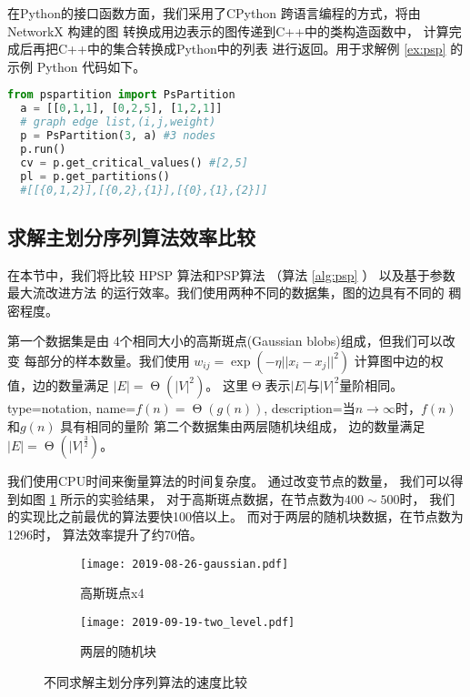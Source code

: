 在Python的接口函数方面，我们采用了CPython
跨语言编程的方式，将由 NetworkX \cite{SciPyProceedings_11} 构建的图
转换成用边表示的图传递到C++中的类构造函数中，
计算完成后再把C++中的集合转换成Python中的列表
进行返回。用于求解例 \ref{ex:psp} 的示例 Python 代码如下。
\begin{lstlisting}[language=Python]
  from pspartition import PsPartition
  a = [[0,1,1], [0,2,5], [1,2,1]] 
  # graph edge list,(i,j,weight)
  p = PsPartition(3, a) #3 nodes
  p.run()
  cv = p.get_critical_values() #[2,5]
  pl = p.get_partitions()
  #[[{0,1,2}],[{0,2},{1}],[{0},{1},{2}]]
\end{lstlisting}

\subsection{求解主划分序列算法效率比较}
在本节中，我们将比较 HPSP 算法和PSP算法
（算法 \ref{alg:psp} ）
以及基于参数最大流改进方法\cite{kolmogorov}
的运行效率。我们使用两种不同的数据集，图的边具有不同的
稠密程度。

第一个数据集是由
4个相同大小的高斯斑点(Gaussian blobs)组成，但我们可以改变
每部分的样本数量。我们使用
  $w_{ij}=\exp(-\eta ||x_i-x_j||^2)$
计算图中边的权值，边的数量满足 $|E|=\upTheta(|V|^2)$。
这里$\upTheta$表示$|E|$与$|V|^2$量阶相同。
{
  type=notation,
  name={$f(n)=\upTheta(g(n))$},
  description={当$n\to \infty$时，$f(n)$和$g(n)$ 具有相同的量阶}
}
第二个数据集由两层随机块组成，
边的数量满足 $|E|=\upTheta(|V|^{\frac{3}{2}})$。

我们使用CPU时间来衡量算法的时间复杂度。
通过改变节点的数量，
我们可以得到如图 \ref{fig:esc} 所示的实验结果，
对于高斯斑点数据，在节点数为$400\sim 500$时，
我们的实现比之前最优的算法要快100倍以上。
而对于两层的随机块数据，在节点数为1296时，
算法效率提升了约70倍。
\begin{figure}
	\centering
	\begin{subfigure}{0.45\textwidth}
		\texttt{[image: 2019-08-26-gaussian.pdf]}
    \caption{高斯斑点x4}
	\end{subfigure}
	\begin{subfigure}{0.45\textwidth}
		\texttt{[image: 2019-09-19-two\_level.pdf]}
    \caption{两层的随机块}
	\end{subfigure}
	\caption{
  不同求解主划分序列算法的速度比较}\label{fig:esc}
\end{figure}

